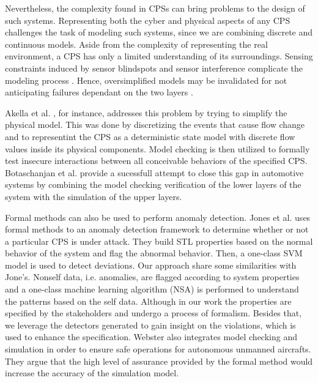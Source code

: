 
Nevertheless, the complexity found in CPSs can bring problems to the design of such systems. 
Representing both the cyber and physical aspects of any CPS challenges the task of modeling such systems, since we are combining discrete and continuous models. Aside from the complexity of representing the real environment, a CPS has only a limited understanding of its surroundings. Sensing constraints induced by sensor blindspots and sensor interference complicate the modeling process \cite{luckcuck2019formal}. Hence, oversimplified models may be invalidated for not anticipating failures dependant on the two layers \cite{2014PerceptionsSOTAV&VCPS}. 

Akella et al. \cite{akella2009model}, for instance, addresses this problem by trying to simplify the physical model. This was done by discretizing the events that cause flow change and to representint the CPS as a deterministic state model with discrete flow values inside its physical components. Model checking is then utilized to formally test insecure interactions between all conceivable behaviors of the specified CPS. Botaschanjan et al. \cite{botaschanjan2008correctness} provide a sucessfull attempt to close this gap in automotive systems by combining the model checking verification of the lower layers of the system with the simulation of the upper layers.

Formal methods can also be used to perform anomaly detection. Jones et al. \cite{jones2014anomaly} uses formal methods to an anomaly detection framework to determine whether or not a particular CPS is under attack. They build STL properties based on the normal behavior of the system and flag the abnormal behavior. Then, a one-class SVM model is used to detect deviations. Our approach share some similarities with Jone's. Nonself data, i.e. anomalies, are flagged according to system properties and a one-class machine learning algorithm (NSA) is performed to understand the patterns based on the self data. Although in our work the properties are specified by the stakeholders and undergo a process of formalism. Besides that, we leverage the detectors generated to gain insight on the violations, which is used to enhance the specification. Webster \cite{webster2014generating} also integrates model checking and simulation in order to ensure safe operations for autonomous unmanned aircrafts. They argue that the high level of assurance provided by the formal method would increase the accuracy of the simulation model.

